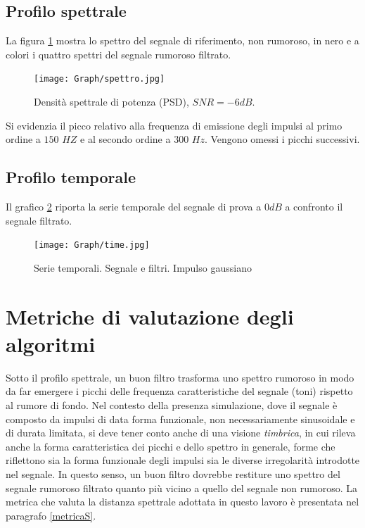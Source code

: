 \subsection{Profilo spettrale}

La figura \ref{fig:c9_I5SNR4spec} mostra lo spettro del segnale di riferimento, non rumoroso, in nero e a colori i quattro spettri del segnale rumoroso filtrato.
%
\begin{figure}[htbp]
\centering
\texttt{[image: Graph/spettro.jpg]}
\caption{Densità spettrale di potenza (PSD), $SNR = -6dB$.}
\label{fig:c9_I5SNR4spec}
\end{figure}
%
Si evidenzia il picco relativo alla frequenza di emissione degli impulsi al primo ordine a $150$ $HZ$ e al secondo ordine a $300$ $Hz$. Vengono omessi i picchi successivi. 



\subsection{Profilo temporale}

Il grafico \ref{fig:c1_I2SNR0time} riporta la serie temporale del segnale di prova a $0dB$ a confronto il segnale filtrato.

\begin{figure}[htbp]
\centering
\texttt{[image: Graph/time.jpg]}
\caption{Serie temporali. Segnale e filtri. Impulso gaussiano}
\label{fig:c1_I2SNR0time}
\end{figure}





\section{Metriche di valutazione degli algoritmi}

Sotto il profilo spettrale, un buon filtro trasforma uno spettro rumoroso in modo da far emergere i picchi delle frequenza caratteristiche del segnale (toni) rispetto al rumore di fondo.
%
Nel contesto della presenza simulazione, dove il segnale è composto da impulsi di data forma funzionale, non necessariamente sinusoidale e di durata limitata, si deve tener conto anche di una visione {\it timbrica}, in cui rileva anche la forma caratteristica dei picchi e dello spettro in generale, forme che riflettono sia la forma funzionale degli impulsi sia le diverse irregolarità introdotte nel segnale.
%
In questo senso, un buon filtro dovrebbe restiture uno spettro del segnale rumoroso filtrato quanto più vicino a quello del segnale non rumoroso.
La metrica che valuta la distanza spettrale adottata in questo lavoro è presentata nel paragrafo \ref{metricaS}.

